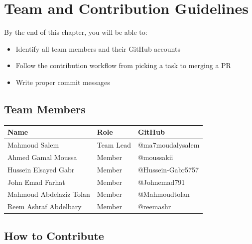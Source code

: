 \documentclass[12pt, a4paper, oneside]{report}
\begin{document}
\chapter{Team and Contribution Guidelines}
\label{ch:team}

\begin{objectivebox}
By the end of this chapter, you will be able to:
\begin{itemize}
    \item Identify all team members and their GitHub accounts
    \item Follow the contribution workflow from picking a task to merging a PR
    \item Write proper commit messages
\end{itemize}
\end{objectivebox}

\section{Team Members}

\begin{center}
\begin{tabular}{l l l}
    \toprule
    \textbf{Name} & \textbf{Role} & \textbf{GitHub} \\
    \midrule
    Mahmoud Salem & Team Lead & @ma7moudalysalem \\
    Ahmed Gamal Moussa & Member & @moussakii \\
    Hussein Elsayed Gabr & Member & @Hussein-Gabr5757 \\
    John Emad Farhat & Member & @Johnemad791 \\
    Mahmoud Abdelaziz Tolan & Member & @Mahmoudtolan \\
    Reem Ashraf Abdelbary & Member & @reemashr \\
    \bottomrule
\end{tabular}
\end{center}

\section{How to Contribute}
\end{document}
